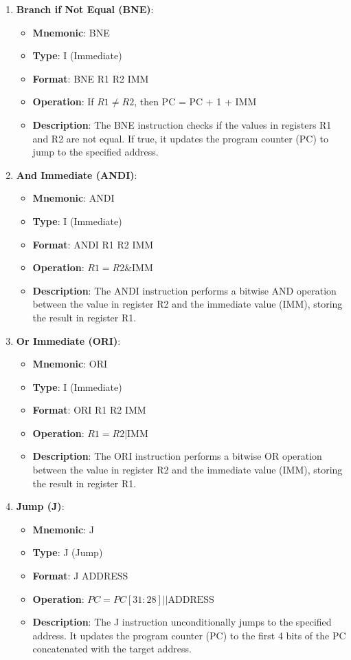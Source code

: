 \documentclass{article}
\begin{document}
\begin{enumerate}
    \item \textbf{Branch if Not Equal (BNE)}:
    \begin{itemize}
        \item \textbf{Mnemonic}: BNE
        \item \textbf{Type}: I (Immediate)
        \item \textbf{Format}: BNE R1 R2 IMM
        \item \textbf{Operation}: If \(R1 \neq R2\), then PC = PC + 1 + IMM
        \item \textbf{Description}: The BNE instruction checks if the values in registers R1 and R2 are not equal. If true, it updates the program counter (PC) to jump to the specified address.
    \end{itemize}
        \item \textbf{And Immediate (ANDI)}:
        \begin{itemize}
        \item \textbf{Mnemonic}: ANDI
        \item \textbf{Type}: I (Immediate)
        \item \textbf{Format}: ANDI R1 R2 IMM
        \item \textbf{Operation}: \(R1 = R2 \& \text{IMM}\)
        \item \textbf{Description}: The ANDI instruction performs a bitwise AND operation between the value in register R2 and the immediate value (IMM), storing the result in register R1.
        \end{itemize}
        
        \item \textbf{Or Immediate (ORI)}:
    \begin{itemize}
        \item \textbf{Mnemonic}: ORI
        \item \textbf{Type}: I (Immediate)
        \item \textbf{Format}: ORI R1 R2 IMM
        \item \textbf{Operation}: \(R1 = R2 | \text{IMM}\)
        \item \textbf{Description}: The ORI instruction performs a bitwise OR operation between the value in register R2 and the immediate value (IMM), storing the result in register R1.
    \end{itemize}

    \item \textbf{Jump (J)}:
    \begin{itemize}
        \item \textbf{Mnemonic}: J
        \item \textbf{Type}: J (Jump)
        \item \textbf{Format}: J ADDRESS
        \item \textbf{Operation}: \(PC =PC[31:28] || \text{ADDRESS}\)
        \item \textbf{Description}: The J instruction unconditionally jumps to the specified address. It updates the program counter (PC) to the first 4 bits of the PC concatenated with the target address.
    \end{itemize}



\end{enumerate}
\end{document}
